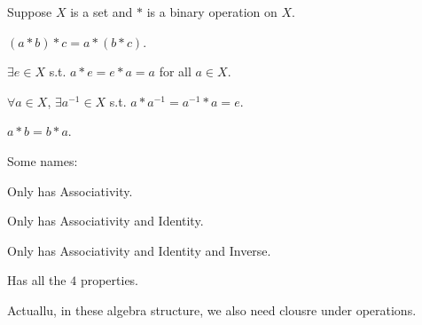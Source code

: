 \begin{definition*}
    Suppose \(X\) is a set and \(*\) is a binary operation on \(X\). 
    \begin{definition}[Associativity]
        \((a * b) * c = a * (b *c)\). 
    \end{definition}  
    \begin{definition}[Identity]
        \(\exists e \in X\) s.t. \(a * e = e * a = a\) for all \(a \in X\).   
    \end{definition} 
    \begin{definition}[Inverse]
        \(\forall a \in X\), \(\exists a^{-1} \in X\) s.t. \(a * a^{-1} = a^{-1} * a = e\).   
    \end{definition}
    \begin{definition}[Commutativity]
        \(a * b = b * a\). 
    \end{definition}
\end{definition*}

\begin{definition}
    Some names:
    \begin{definition}[Semigroup]
        Only has Associativity.
    \end{definition}
    \begin{definition}[Monoid]
        Only has Associativity and Identity.
    \end{definition}
    \begin{definition}[Group]
        Only has Associativity and Identity and Inverse.
    \end{definition}
    \begin{definition}
       Has all the \(4\) properties.  
    \end{definition}
\end{definition}

\begin{note}
    Actuallu, in these algebra structure, we also need clousre under operations.
\end{note}